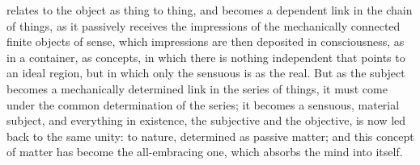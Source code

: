 relates to the object as thing to thing, and becomes a dependent link
in the chain of things, as it passively receives the impressions of the
mechanically connected finite objects of sense, which impressions are
then deposited in consciousness, as in a container, as concepts, in
which there is nothing independent that points to an ideal region, but
in which only the sensuous is as the real. But as the subject becomes a
mechanically determined link in the series of things, it must come
under the common determination of the series; it becomes a sensuous,
material subject, and everything in existence, the subjective and the
objective, is now led back to the same unity: to nature, determined as
passive matter; and this concept of matter has become the
all-embracing one, which absorbs the mind into itself.

\divrule

